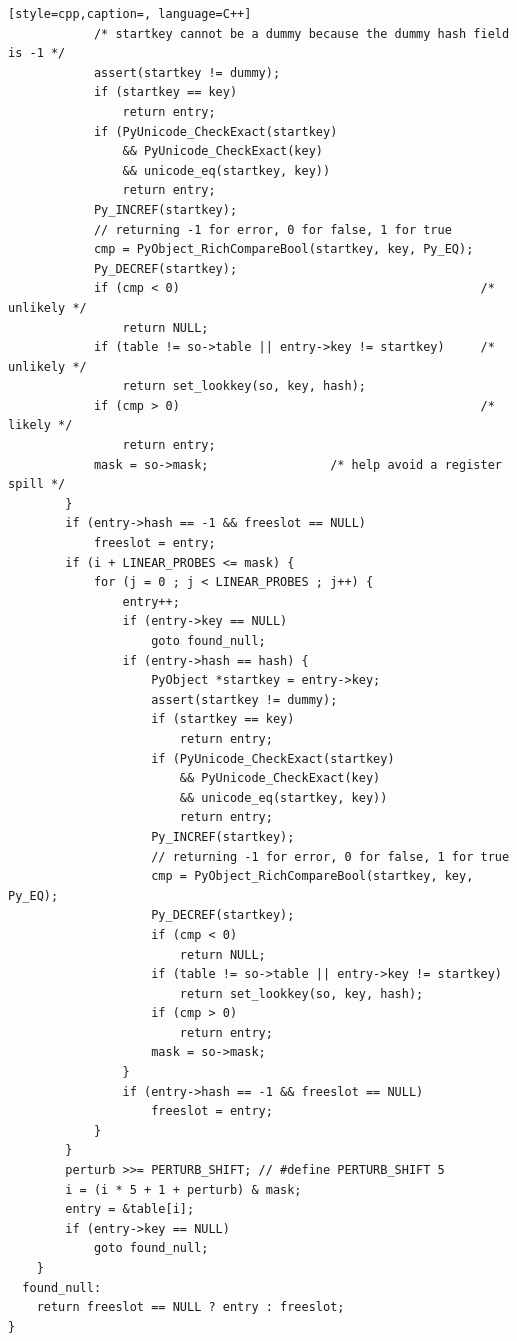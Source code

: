 \begin{lstlisting}[style=cpp,caption=, language=C++]
            /* startkey cannot be a dummy because the dummy hash field is -1 */
            assert(startkey != dummy);
            if (startkey == key)
                return entry;
            if (PyUnicode_CheckExact(startkey)
                && PyUnicode_CheckExact(key)
                && unicode_eq(startkey, key))
                return entry;
            Py_INCREF(startkey);
            // returning -1 for error, 0 for false, 1 for true
            cmp = PyObject_RichCompareBool(startkey, key, Py_EQ);
            Py_DECREF(startkey);
            if (cmp < 0)                                          /* unlikely */
                return NULL;
            if (table != so->table || entry->key != startkey)     /* unlikely */
                return set_lookkey(so, key, hash);
            if (cmp > 0)                                          /* likely */
                return entry;
            mask = so->mask;                 /* help avoid a register spill */
        }
        if (entry->hash == -1 && freeslot == NULL)
            freeslot = entry;
        if (i + LINEAR_PROBES <= mask) {
            for (j = 0 ; j < LINEAR_PROBES ; j++) {
                entry++;
                if (entry->key == NULL)
                    goto found_null;
                if (entry->hash == hash) {
                    PyObject *startkey = entry->key;
                    assert(startkey != dummy);
                    if (startkey == key)
                        return entry;
                    if (PyUnicode_CheckExact(startkey)
                        && PyUnicode_CheckExact(key)
                        && unicode_eq(startkey, key))
                        return entry;
                    Py_INCREF(startkey);
                    // returning -1 for error, 0 for false, 1 for true
                    cmp = PyObject_RichCompareBool(startkey, key, Py_EQ);
                    Py_DECREF(startkey);
                    if (cmp < 0)
                        return NULL;
                    if (table != so->table || entry->key != startkey)
                        return set_lookkey(so, key, hash);
                    if (cmp > 0)
                        return entry;
                    mask = so->mask;
                }
                if (entry->hash == -1 && freeslot == NULL)
                    freeslot = entry;
            }
        }
        perturb >>= PERTURB_SHIFT; // #define PERTURB_SHIFT 5
        i = (i * 5 + 1 + perturb) & mask;
        entry = &table[i];
        if (entry->key == NULL)
            goto found_null;
    }
  found_null:
    return freeslot == NULL ? entry : freeslot;
}
\end{lstlisting}

